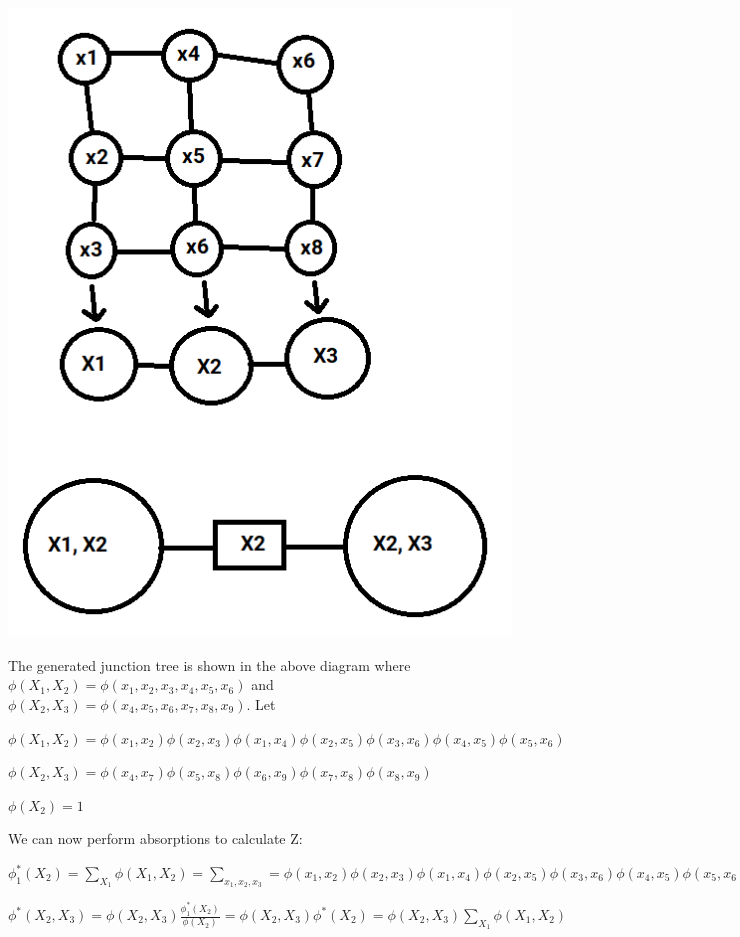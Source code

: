 \documentclass[12pt]{article}
\begin{document}
\includegraphics[scale=0.5]{q4}

The generated junction tree is shown in the above diagram where $\phi(X_1, X_2) = \phi(x_1, x_2, x_3, x_4, x_5, x_6)$ and $\phi(X_2, X_3) = \phi(x_4, x_5, x_6, x_7, x_8, x_9)$. Let 

$\phi(X_1, X_2) = \phi(x_1, x_2)\phi(x_2, x_3)\phi(x_1, x_4)\phi(x_2, x_5)\phi(x_3, x_6)\phi(x_4, x_5)\phi(x_5, x_6)$

$\phi(X_2, X_3) = \phi(x_4, x_7)\phi(x_5, x_8)\phi(x_6, x_9)\phi(x_7, x_8)\phi(x_8, x_9)$

$\phi(X_2) = 1$

We can now perform absorptions to calculate Z:

$\phi_1^*(X_2) = \sum_{X_1} \phi(X_1, X_2) = \sum_{x_1, x_2, x_3} = \phi(x_1, x_2)\phi(x_2, x_3)\phi(x_1, x_4)\phi(x_2, x_5)\phi(x_3, x_6)\phi(x_4, x_5)\phi(x_5, x_6)$

$\phi^*(X_2, X_3) = \phi(X_2, X_3)\frac{\phi_1^*(X_2)}{\phi(X_2)} = \phi(X_2, X_3)\phi^*(X_2) = \phi(X_2, X_3)\sum_{X_1} \phi(X_1, X_2)$
\end{document}
